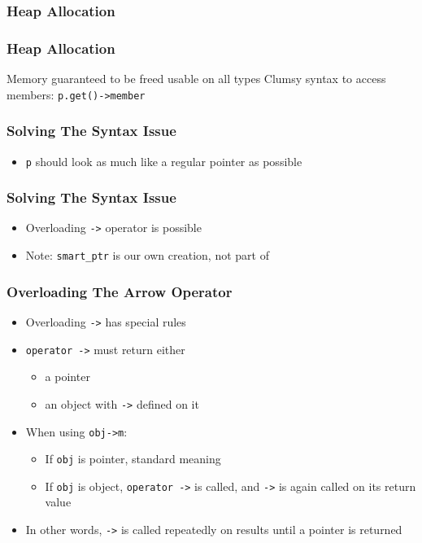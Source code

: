 \begin{frame}
  \frametitle{Heap Allocation}
\end{frame}

\begin{frame}
  \frametitle{Heap Allocation}
  \begin{procontralist}
    \pro Memory guaranteed to be freed
     usable on all types
    \con Clumsy syntax to access members: {\tt p.get()->member}
  \end{procontralist}
\end{frame}

\begin{frame}
  \frametitle{Solving The Syntax Issue}
  \begin{itemize}
    \item {\tt p} should look as much like a regular pointer as possible
  \end{itemize}
\end{frame}

\begin{frame}
  \frametitle{Solving The Syntax Issue}
  \begin{itemize}
    \item Overloading {\tt ->} operator is possible
    \item Note: \texttt{smart\_ptr} is our own creation, not part of \cpp
  \end{itemize}
\end{frame}

\begin{frame}
  \frametitle{Overloading The Arrow Operator}
  \begin{itemize}
    \item Overloading \texttt{->} has special rules
    \item \texttt{operator ->} must return either
          \begin{itemize}
            \item a pointer
            \item an object with \texttt{->} defined on it
          \end{itemize}
    \item When using \texttt{obj->m}:
          \begin{itemize}
            \item If \texttt{obj} is pointer, standard meaning
            \item If \texttt{obj} is object, \texttt{operator ->} is called, and
                  \texttt{->} is again called on its return value
          \end{itemize}
    \item In other words, \texttt{->} is called repeatedly on results until
          a pointer is returned
  \end{itemize}
\end{frame}

